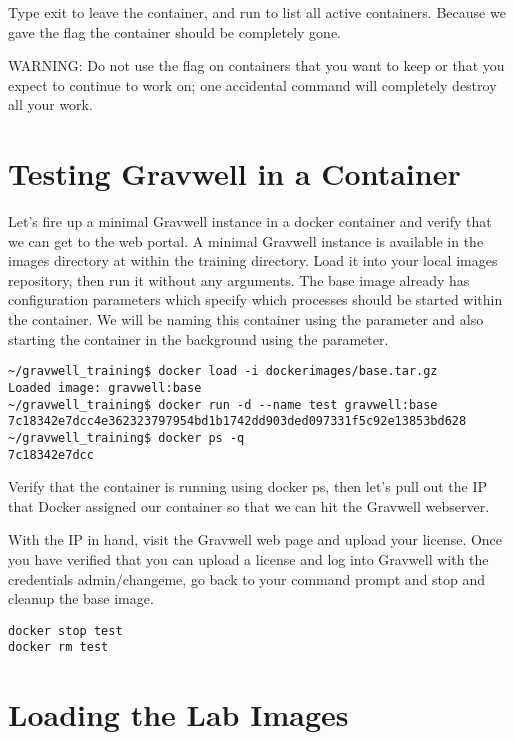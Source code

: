 Type exit to leave the container, and run  to list all
active containers. Because we gave the  flag the container
should be completely gone.

WARNING: Do not use the  flag on containers that you want
to keep or that you expect to continue to work on; one accidental
 command will completely destroy all your work.

\section{Testing Gravwell in a Container}

Let's fire up a minimal Gravwell instance in a docker container and
verify that we can get to the web portal. A minimal Gravwell instance
is available in the images directory at  within
the training directory. Load it into your local images repository,
then run it without any arguments. The base image already has
configuration parameters which specify which processes should be started
within the container. We will be naming this container  using
the  parameter and also starting the container in the
background using the  parameter.

\begin{Verbatim}[breaklines=true]
~/gravwell_training$ docker load -i dockerimages/base.tar.gz 
Loaded image: gravwell:base
~/gravwell_training$ docker run -d --name test gravwell:base
7c18342e7dcc4e362323797954bd1b1742dd903ded097331f5c92e13853bd628
~/gravwell_training$ docker ps -q
7c18342e7dcc
\end{Verbatim}

Verify that the container is running using docker ps, then let's pull
out the IP that Docker assigned our container so that we can hit the
Gravwell webserver.


With the IP in hand, visit the Gravwell web page and upload your
license. Once you have verified that you can upload a license and log
into Gravwell with the credentials admin/changeme, go back to your
command prompt and stop and cleanup the base image.

\begin{Verbatim}[breaklines=true]
docker stop test
docker rm test
\end{Verbatim}

\section{Loading the Lab Images}
\label{sec:load-lab-images}

